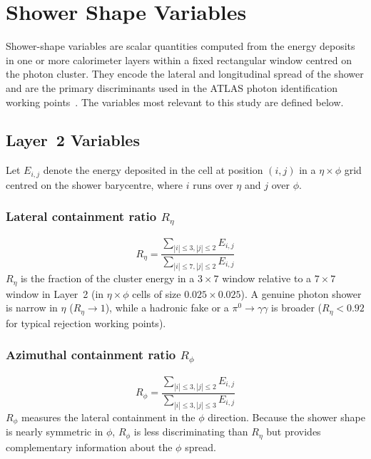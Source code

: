 \documentclass[11pt,a4paper]{article}
\newcommand{\Reta}{R_{\eta}}
\newcommand{\Rphi}{R_{\phi}}
\begin{document}
\section{Shower Shape Variables}
\label{sec:variables}

Shower-shape variables are scalar quantities computed from the energy
deposits in one or more calorimeter layers within a fixed rectangular
window centred on the photon cluster.  They encode the lateral and
longitudinal spread of the shower and are the primary discriminants
used in the ATLAS photon identification working
points~\cite{ATLAS:photonID2019,ATLAS:photonID2022}.  The variables
most relevant to this study are defined below.

\subsection{Layer~2 Variables}
\label{sec:variables:layer2}

Let $E_{i,j}$ denote the energy deposited in the cell at position
$(i, j)$ in a $\eta \times \phi$ grid centred on the shower
barycentre, where $i$ runs over $\eta$ and $j$ over $\phi$.

\subsubsection{Lateral containment ratio \texorpdfstring{$\Reta$}{Reta}}

\begin{equation}
  \Reta = \frac{\sum_{|i|\le 3, |j|\le 2} E_{i,j}}
               {\sum_{|i|\le 7, |j|\le 2} E_{i,j}}
  \label{eq:reta}
\end{equation}
$\Reta$ is the fraction of the cluster energy in a $3\times 7$
window relative to a $7\times 7$ window in Layer~2
(in $\eta \times \phi$ cells of size $0.025 \times 0.025$).
A genuine photon shower is narrow in $\eta$ ($\Reta \to 1$), while
a hadronic fake or a $\pi^0 \to \gamma\gamma$ is broader ($\Reta <
0.92$ for typical rejection working points).

\subsubsection{Azimuthal containment ratio \texorpdfstring{$\Rphi$}{Rphi}}

\begin{equation}
  \Rphi = \frac{\sum_{|i|\le 3, |j|\le 2} E_{i,j}}
               {\sum_{|i|\le 3, |j|\le 3} E_{i,j}}
  \label{eq:rphi}
\end{equation}
$\Rphi$ measures the lateral containment in the $\phi$ direction.
Because the shower shape is nearly symmetric in $\phi$, $\Rphi$
is less discriminating than $\Reta$ but provides complementary
information about the $\phi$ spread.
\end{document}
